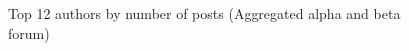 \begin{figure}[h!] 
    \centering 
    
    \caption{Top 12 authors by number of posts (Aggregated alpha and beta forum)}
    \label{fig:forum-posts}  
  \end{figure}
